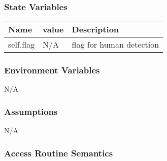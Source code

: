 \documentclass[12pt, titlepage]{article}
\begin{document}
\subsubsection{State Variables}

\begin{center}
\begin{tabular}{|p{4cm}|p{4cm}|l|}
\hline
\textbf{Name} & \textbf{value} & \textbf{Description}\\
\hline
self.flag & N/A & flag for human detection\\
\hline

\end{tabular}
\end{center}


\subsubsection{Environment Variables}

N/A


\subsubsection{Assumptions}

N/A

\subsubsection{Access Routine Semantics}
\end{document}

